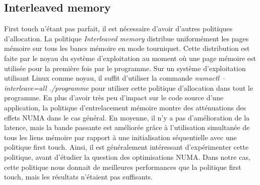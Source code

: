 \subsection{Interleaved memory}
First touch n'étant pas parfait, il est nécessaire d'avoir d'autres politiques d'allocation.
%
La politique {\em Interleaved memory} distribue uniformément les pages mémoire sur tous les bancs mémoire en mode tourniquet.
%
Cette distribution est faite par le noyau du système d'exploitation au moment où une page mémoire est utilisée pour la première fois par le programme.
%
Sur un système d'exploitation utilisant Linux comme noyau, il suffit d'utiliser la commande {\em numactl --interleave=all ./programme} pour utiliser cette politique d'allocation dans tout le programme.
%
En plus d'avoir très peu d'impact sur le code source d'une application, la politique d'entrelacement mémoire montre des atténuations des effets NUMA dans le cas général.
%
En moyenne, il n'y a pas d'amélioration de la latence, mais la bande passante est améliorée grâce à l'utilisation simultanée de tous les liens mémoire par rapport à une initialisation séquentielle avec une politique first touch.
%
Ainsi, il est généralement intéressant d'expérimenter cette politique, avant d'étudier la question des optimisations NUMA.
%
Dans notre cas, cette politique nous donnait de meilleures performances que la politique first touch, mais les résultats n'étaient pas suffisants.
